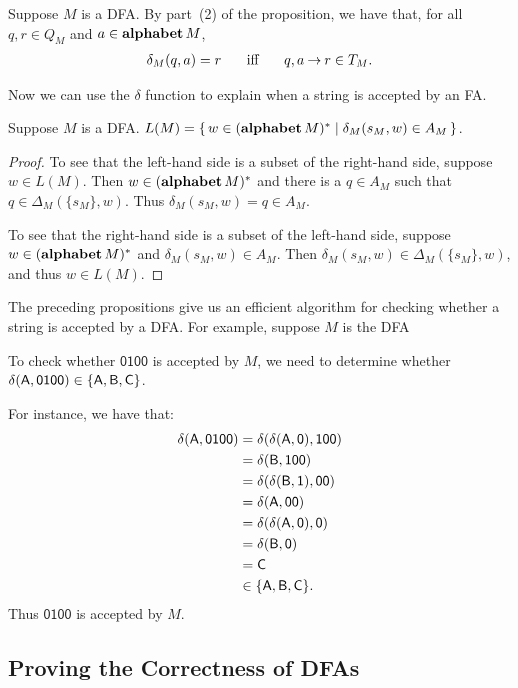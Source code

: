 Suppose $M$ is a DFA.  By part~(2) of the proposition, we have that,
for all $q,r\in Q_M$ and $a\in\mathbf{alphabet}\,M$,
\begin{gather*}
\delta_M(q,a)=r\quad\mathrel{\;\;\allowbreak\mbox{iff}\allowbreak\;\;}\quad q,a\mathbin{\to} r\in T_M .
\end{gather*}

Now we can use the $\delta$ function to explain when a string is
accepted by an FA.

\begin{proposition}
\label{DetermProp3}
Suppose $M$ is a DFA.
$L(M)=\{ \, w\in(\mathbf{alphabet}\,M)^* \mid \delta_M(s_M,w)\in A_M \, \}$.
\end{proposition}
\begin{proof}
To see that the left-hand side is a subset of the right-hand side,
suppose $w\in L(M)$.  Then $w\in(\mathbf{alphabet}\,M)^*$ and there is a $q\in A_M$
such that $q\in\Delta_M(\{s_M\},w)$.  Thus $\delta_M(s_M,w)=q\in A_M$.

To see that the right-hand side is a subset of the left-hand side,
suppose $w\in(\mathbf{alphabet}\,M)^*$ and $\delta_M(s_M,w)\in A_M$.  Then
$\delta_M(s_M,w)\in\Delta_M(\{s_M\},w)$, and thus $w\in L(M)$.
\end{proof}

The preceding propositions give us an efficient algorithm for checking
whether a string is accepted by a DFA.  For example, suppose
$M$ is the DFA
\begin{center}

\end{center}
To check whether $\mathsf{0100}$ is accepted by $M$, we need
to determine whether $\delta(\mathsf{A},\mathsf{0100})\in\{\mathsf{A},\mathsf{B},\mathsf{C}\}$.

For instance, we have that:
\begin{align*}
\delta(\mathsf{A},\mathsf{0100})
&= \delta(\delta(\mathsf{A}, \mathsf{0}),\mathsf{100}) \\
&= \delta(\mathsf{B},\mathsf{100}) \\
&= \delta(\delta(\mathsf{B},\mathsf{1}),\mathsf{00}) \\
&= \delta(\mathsf{A},\mathsf{00}) \\
&= \delta(\delta(\mathsf{A},\mathsf{0}),\mathsf{0}) \\
&= \delta(\mathsf{B},\mathsf{0}) \\
&= \mathsf{C} \\
&\in \{\mathsf{A},\mathsf{B},\mathsf{C}\}.
\end{align*}
Thus $\mathsf{0100}$ is accepted by $M$.

\subsection{Proving the Correctness of DFAs}

